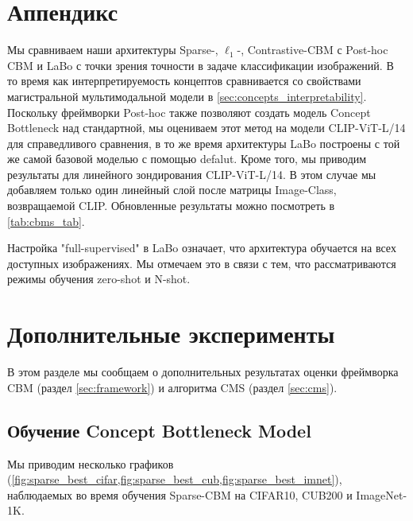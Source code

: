 \newpage

\appendix
\section{Аппендикс}
\label{sec:appendix}

Мы сравниваем наши архитектуры Sparse-, $\ell_1$-, Contrastive-CBM с Post-hoc CBM \cite{yuksekgonul2023posthoc} и LaBo \cite{yang2023language} с точки зрения точности в задаче классификации изображений. В то время как интерпретируемость концептов сравнивается со свойствами магистральной мультимодальной модели в \cref{sec:concepts_interpretability}. Поскольку фреймворки Post-hoc также позволяют создать модель Concept Bottleneck над стандартной, мы оцениваем этот метод на модели CLIP-ViT-L/14 для справедливого сравнения, в то же время архитектуры LaBo построены с той же самой базовой моделью с помощью defalut. Кроме того, мы приводим результаты для линейного зондирования CLIP-ViT-L/14. В этом случае мы добавляем только один линейный слой после матрицы Image-Class, возвращаемой CLIP. Обновленные результаты можно посмотреть в \cref{tab:cbms_tab}.

Настройка "full-supervised" в LaBo означает, что архитектура обучается на всех доступных изображениях. Мы отмечаем это в связи с тем, что рассматриваются режимы обучения \cite{yang2023language} zero-shot и N-shot.

\section{Дополнительные эксперименты}
В этом разделе мы сообщаем о дополнительных результатах оценки фреймворка CBM (раздел \ref{sec:framework}) и алгоритма CMS (раздел \ref{sec:cms}).

\subsection{Обучение Concept Bottleneck Model}
Мы приводим несколько графиков (\cref{fig:sparse_best_cifar,fig:sparse_best_cub,fig:sparse_best_imnet}), наблюдаемых во время обучения Sparse-CBM на CIFAR10, CUB200 и ImageNet-1K.

